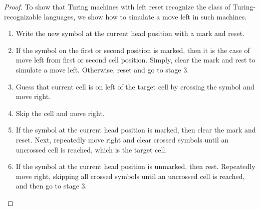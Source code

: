 \documentclass[11pt]{article}
\begin{document}
\begin{proof}
To show that Turing machines with left reset recognize the class of Turing-recognizable languages, we show how to simulate a move left in such machines.
\begin{enumerate}
\item Write the new symbol at the current head position with a mark and reset.
\item  If the symbol on the first or second position is marked, then it is the case of move left from first or second cell position. Simply, clear the mark and rest to simulate a move left. Otherwise, reset and go to stage 3.
\item Guess that current cell is on left of the target cell by crossing the symbol and move right.
\item Skip the cell and move right.
\item If the symbol at the current head position is marked, then clear the mark and reset. Next, repeatedly move right and clear crossed symbols until an uncrossed cell is reached, which is the target cell.
\item If the symbol at the current head position is unmarked, then rest. Repeatedly move right, skipping all crossed symbols until an uncrossed cell is reached, and then go to stage 3.
\end{enumerate}
\end{proof}
\end{document}
